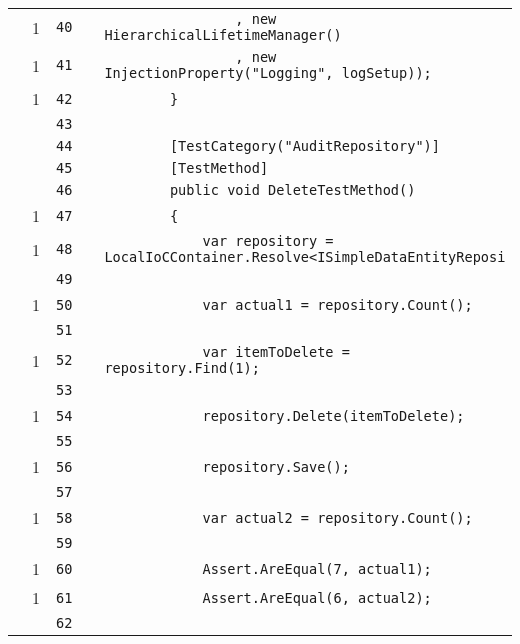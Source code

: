 \documentclass[a4paper,10pt]{article}
\begin{document}
\begin{longtable}[l]{lrrll}
\cellcolor{green} & 1 & \verb~40~ & & \verb~                , new HierarchicalLifetimeManager()~\\
\cellcolor{green} & 1 & \verb~41~ & & \verb~                , new InjectionProperty("Logging", logSetup));~\\
\cellcolor{green} & 1 & \verb~42~ & & \verb~        }~\\
\cellcolor{gray} &  & \verb~43~ & & \verb~~\\
\cellcolor{gray} &  & \verb~44~ & & \verb~        [TestCategory("AuditRepository")]~\\
\cellcolor{gray} &  & \verb~45~ & & \verb~        [TestMethod]~\\
\cellcolor{gray} &  & \verb~46~ & & \verb~        public void DeleteTestMethod()~\\
\cellcolor{green} & 1 & \verb~47~ & & \verb~        {~\\
\cellcolor{green} & 1 & \verb~48~ & & \verb~            var repository = LocalIoCContainer.Resolve<ISimpleDataEntityReposi~\\
\cellcolor{gray} &  & \verb~49~ & & \verb~~\\
\cellcolor{green} & 1 & \verb~50~ & & \verb~            var actual1 = repository.Count();~\\
\cellcolor{gray} &  & \verb~51~ & & \verb~~\\
\cellcolor{green} & 1 & \verb~52~ & & \verb~            var itemToDelete = repository.Find(1);~\\
\cellcolor{gray} &  & \verb~53~ & & \verb~~\\
\cellcolor{green} & 1 & \verb~54~ & & \verb~            repository.Delete(itemToDelete);~\\
\cellcolor{gray} &  & \verb~55~ & & \verb~~\\
\cellcolor{green} & 1 & \verb~56~ & & \verb~            repository.Save();~\\
\cellcolor{gray} &  & \verb~57~ & & \verb~~\\
\cellcolor{green} & 1 & \verb~58~ & & \verb~            var actual2 = repository.Count();~\\
\cellcolor{gray} &  & \verb~59~ & & \verb~~\\
\cellcolor{green} & 1 & \verb~60~ & & \verb~            Assert.AreEqual(7, actual1);~\\
\cellcolor{green} & 1 & \verb~61~ & & \verb~            Assert.AreEqual(6, actual2);~\\
\cellcolor{gray} &  & \verb~62~ & & \verb~~\\

\end{longtable}
\end{document}
